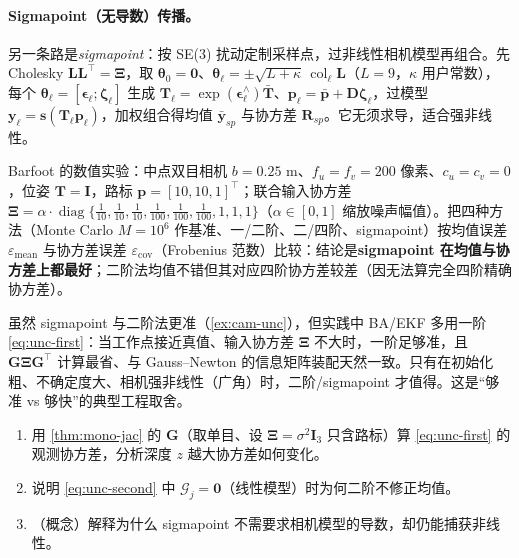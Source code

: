\paragraph{Sigmapoint（无导数）传播。}
另一条路是\emph{sigmapoint}：按 SE(3) 扰动定制采样点，过非线性相机模型再组合\cite{barfoot2024state}。先 Cholesky $\mathbf{L}\mathbf{L}^\top=\boldsymbol\Xi$，取 $\boldsymbol\theta_0=\mathbf{0}$、$\boldsymbol\theta_\ell=\pm\sqrt{L+\kappa}\,\operatorname{col}_\ell\mathbf{L}$（$L=9$，$\kappa$ 用户常数），每个 $\boldsymbol\theta_\ell=[\boldsymbol\epsilon_\ell;\boldsymbol\zeta_\ell]$ 生成 $\mathbf{T}_\ell=\exp(\boldsymbol\epsilon_\ell^\wedge)\bar{\mathbf{T}}$、$\mathbf{p}_\ell=\bar{\mathbf{p}}+\mathbf{D}\boldsymbol\zeta_\ell$，过模型 $\mathbf{y}_\ell=\mathbf{s}(\mathbf{T}_\ell\mathbf{p}_\ell)$，加权组合得均值 $\bar{\mathbf{y}}_{sp}$ 与协方差 $\mathbf{R}_{sp}$。它无须求导，适合强非线性。

\begin{example}[相机不确定度传播实验]\label{ex:cam-unc}
Barfoot 的数值实验\cite{barfoot2024state}：中点双目相机 $b=0.25$ m、$f_u=f_v=200$ 像素、$c_u=c_v=0$，位姿 $\mathbf{T}=\mathbf{I}$，路标 $\mathbf{p}=[10,10,1]^\top$；联合输入协方差 $\boldsymbol\Xi=\alpha\cdot\operatorname{diag}\{\tfrac1{10},\tfrac1{10},\tfrac1{10},\tfrac1{100},\tfrac1{100},\tfrac1{100},1,1,1\}$（$\alpha\in[0,1]$ 缩放噪声幅值）。把四种方法（Monte Carlo $M=10^6$ 作基准、一/二阶、二/四阶、sigmapoint）按均值误差 $\varepsilon_{\text{mean}}$ 与协方差误差 $\varepsilon_{\text{cov}}$（Frobenius 范数）比较：结论是\textbf{sigmapoint 在均值与协方差上都最好}；二阶法均值不错但其对应四阶协方差较差（因无法算完全四阶精确协方差）。
\end{example}

\begin{insight}
虽然 sigmapoint 与二阶法更准（\cref{ex:cam-unc}），但实践中 BA/EKF 多用一阶 \cref{eq:unc-first}：当工作点接近真值、输入协方差 $\boldsymbol\Xi$ 不大时，一阶足够准，且 $\mathbf{G}\boldsymbol\Xi\mathbf{G}^\top$ 计算最省、与 Gauss--Newton 的信息矩阵装配天然一致。只有在初始化粗、不确定度大、相机强非线性（广角）时，二阶/sigmapoint 才值得。这是“够准 vs 够快”的典型工程取舍。
\end{insight}

\begin{practice}
\begin{enumerate}
  \item 用 \cref{thm:mono-jac} 的 $\mathbf{G}$（取单目、设 $\boldsymbol\Xi=\sigma^2\mathbf{I}_3$ 只含路标）算 \cref{eq:unc-first} 的观测协方差，分析深度 $z$ 越大协方差如何变化。
  \item 说明 \cref{eq:unc-second} 中 $\boldsymbol{\mathcal{G}}_j=\mathbf{0}$（线性模型）时为何二阶不修正均值。
  \item （概念）解释为什么 sigmapoint 不需要求相机模型的导数，却仍能捕获非线性。
\end{enumerate}
\end{practice}


